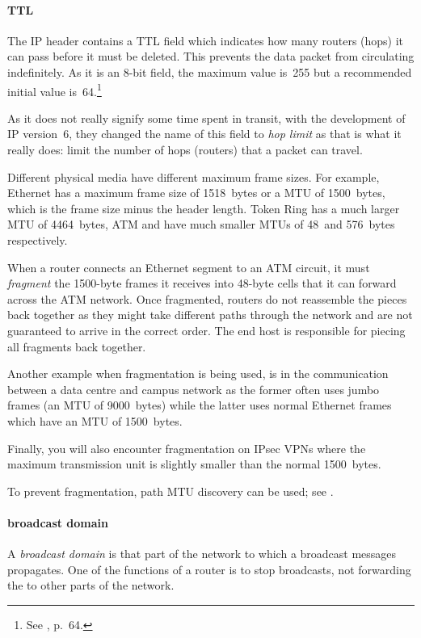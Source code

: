\paragraph{\acl{TTL}}
\label{par:ip-ttl}
The \acs{IP} header contains a \gls{TTL} field which indicates how many routers (hops) it can pass before it must be deleted.
This prevents the data packet from circulating indefinitely.
As it is an 8-bit field, the maximum value is~255 but a recommended initial value is~64.\footnote{See , p.~64.}

As it does not really signify some time spent in transit, with the development of \acs{IP} version~6, they changed the name of this field to \emph{hop limit} as that is what it really does: limit the number of hops (routers) that a packet can travel.


\label{par:ip-fragmentation}
Different physical media have different maximum frame sizes.
For example, Ethernet has a maximum frame size of 1518~bytes or a \gls{MTU} of 1500~bytes, which is the frame size minus the header length.
Token Ring has a much larger \gls{MTU} of 4464~bytes, \gls{ATM} and  have much smaller \acp{MTU} of 48~and 576~bytes respectively.

When a router connects an Ethernet segment to an \gls{ATM} circuit, it must \emph{fragment} the 1500-byte frames it receives into 48-byte cells that it can forward across the \ac{ATM} network.
Once fragmented, routers do not reassemble the pieces back together as they might take different paths through the network and are not guaranteed to arrive in the correct order.
The end host is responsible for piecing all fragments back together.

Another example when fragmentation is being used, is in the communication between a data centre and campus network as the former often uses jumbo frames (an \acs{MTU} of 9000~bytes) while the latter uses normal Ethernet frames which have an \acs{MTU} of 1500~bytes.%

Finally, you will also encounter fragmentation on IPsec \aclp{VPN} where the maximum transmission unit is slightly smaller than the normal 1500~bytes.

To prevent fragmentation, path \acs{MTU} discovery can be used; see .

\paragraph{broadcast domain}
A \emph{broadcast domain} is that part of the network to which a broadcast messages propagates.
One of the functions of a router is to stop broadcasts, not forwarding the to other parts of the network.

